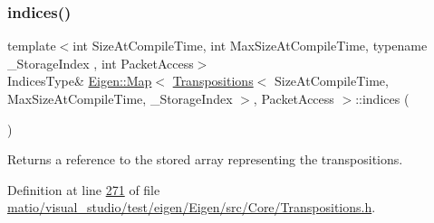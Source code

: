 \mbox{\label{class_eigen_1_1_map_3_01_transpositions_3_01_size_at_compile_time_00_01_max_size_at_compile_timecc993082d7c0ba51ca94b27e97da8dd3_a1f8c96b93122a0e3237a05c11e8812c5}} 
\subsubsection{\texorpdfstring{indices()}{indices()}\hspace{0.1cm}{\footnotesize\ttfamily [4/4]}}
{\footnotesize\ttfamily template$<$int Size\+At\+Compile\+Time, int Max\+Size\+At\+Compile\+Time, typename \+\_\+\+Storage\+Index , int Packet\+Access$>$ \\
Indices\+Type\& \hyperlink{group___core___module_class_eigen_1_1_map}{Eigen\+::\+Map}$<$ \hyperlink{group___core___module_class_eigen_1_1_transpositions}{Transpositions}$<$ Size\+At\+Compile\+Time, Max\+Size\+At\+Compile\+Time, \+\_\+\+Storage\+Index $>$, Packet\+Access $>$\+::indices (\begin{DoxyParamCaption}{ }\end{DoxyParamCaption})\hspace{0.3cm}{\ttfamily [inline]}}

\begin{DoxyReturn}{Returns}
a reference to the stored array representing the transpositions. 
\end{DoxyReturn}


Definition at line \hyperlink{matio_2visual__studio_2test_2eigen_2_eigen_2src_2_core_2_transpositions_8h_source_l00271}{271} of file \hyperlink{matio_2visual__studio_2test_2eigen_2_eigen_2src_2_core_2_transpositions_8h_source}{matio/visual\+\_\+studio/test/eigen/\+Eigen/src/\+Core/\+Transpositions.\+h}.


